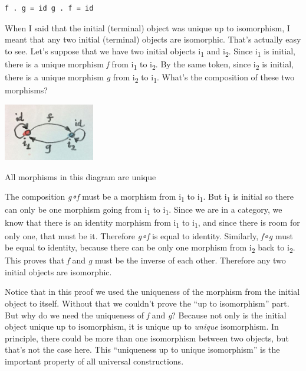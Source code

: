 \begin{verbatim}
f . g = id g . f = id
\end{verbatim}

When I said that the initial (terminal) object was unique up to
isomorphism, I meant that any two initial (terminal) objects are
isomorphic. That's actually easy to see. Let's suppose that we have two
initial objects i\textsubscript{1} and i\textsubscript{2}. Since
i\textsubscript{1} is initial, there is a unique morphism \emph{f} from
i\textsubscript{1} to i\textsubscript{2}. By the same token, since
i\textsubscript{2} is initial, there is a unique morphism \emph{g} from
i\textsubscript{2} to i\textsubscript{1}. What's the composition of
these two morphisms?

\hypertarget{attachment_3837}{}
\includegraphics[width=1.56250in]{images/uniqueness.jpg}

All morphisms in this diagram are unique

The composition \emph{g∘f} must be a morphism from i\textsubscript{1} to
i\textsubscript{1}. But i\textsubscript{1} is initial so there can only
be one morphism going from i\textsubscript{1} to i\textsubscript{1}.
Since we are in a category, we know that there is an identity morphism
from i\textsubscript{1} to i\textsubscript{1}, and since there is room
for only one, that must be it. Therefore \emph{g∘f} is equal to
identity. Similarly, \emph{f∘g} must be equal to identity, because there
can be only one morphism from i\textsubscript{2} back to
i\textsubscript{2}. This proves that \emph{f} and \emph{g} must be the
inverse of each other. Therefore any two initial objects are isomorphic.

Notice that in this proof we used the uniqueness of the morphism from
the initial object to itself. Without that we couldn't prove the ``up to
isomorphism'' part. But why do we need the uniqueness of \emph{f} and
\emph{g}? Because not only is the initial object unique up to
isomorphism, it is unique up to \emph{unique} isomorphism. In principle,
there could be more than one isomorphism between two objects, but that's
not the case here. This ``uniqueness up to unique isomorphism'' is the
important property of all universal constructions.

